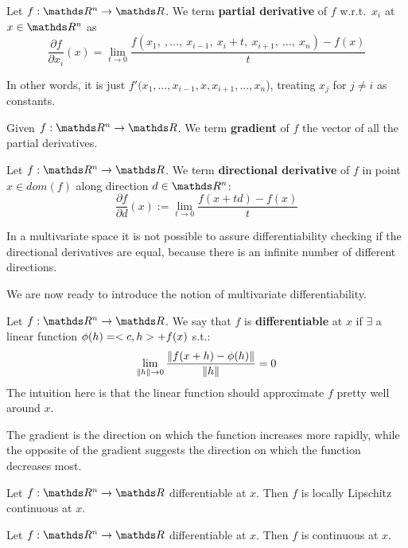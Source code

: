 \documentclass[ComputationalMathematics.tex]{subfiles}
\begin{document}
\begin{definition}
Let $f : \R^n \to \R$. We term \textbf{partial derivative} of $f$ w.r.t.~$x_i$ at $x \in \R^n$ as
  \[
  \frac{\partial f}{\partial x_i}(x) = \lim_{t \to 0} \frac{f(x_1,~, \ldots,~x_{i-1},~x_i + t,~x_{i+1},~\ldots,~x_n) - f(x)}{t}
  \]
       
In other words, it is just $f'(x_1,\dots,x_{i-1},x,x_{i+1},\dots,x_n$), treating $x_j$ for $j \neq i$ as constants.
\end{definition}

\begin{definition}[Gradient]
Given $f : \R^n \to \R$. We term \textbf{gradient} of $f$ the vector of all the partial derivatives.
\end{definition}

\begin{definition}
  Let $f : \R^n \to \R$. We term \textbf{directional derivative} of $f$ in point $x \in dom(f)$ along direction $d \in \R^n$:
  \[
    \frac{\partial f}{\partial d}(x) :=	\lim_{t \to 0} \frac{f(x + td ) - f(x)}{t}
  \]
\end{definition}

In a multivariate space it is not possible to assure differentiability checking if the directional derivatives are equal, because there is an infinite number of different directions.

We are now ready to introduce the notion of multivariate differentiability.

\begin{definition}[Differentiable]
Let $f: \R^n \to \R$. We say that $f$ is \textbf{differentiable} at $x$ if $\exists$ a linear function $\phi(h) = <c, h> + f(x)$ s.t.:
  \[
    \lim_{\left\lVert h\right\rVert \to 0} \frac{\left\lVert f(x + h) - \phi(h)\right\rVert}{\left\lVert h\right\rVert}= 0
  \]
  The intuition here is that the linear function should approximate $f$ pretty well around $x$.
\end{definition}

The gradient is the direction on which the function increases more rapidly, while the opposite of the gradient suggests the direction on which the function decreases most.

\begin{proposition}
Let $f : \R^n \to \R$ differentiable at $x$. Then $f$ is locally Lipschitz continuous at $x$.
\end{proposition}

\begin{corollary}
Let $f : \R^n \to \R$ differentiable at $x$. Then $f$ is continuous at $x$.
\end{corollary}
\end{document}
